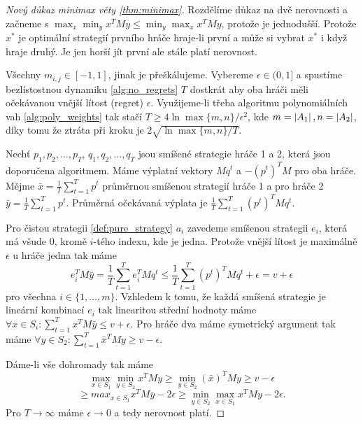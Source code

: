 \begin{proof}[Nový důkaz minimax věty \ref{thm:minimax}]
    Rozdělíme důkaz na dvě nerovnosti a začneme s $\max_x \min_y x^T My \leq \min_y \max_x x^T M y$, protože je jednodušší. 
    Protože $x^*$ je optimální strategií prvního hráče hraje-li první a může si vybrat $x^*$ i když hraje druhý. 
    Je jen horší jít první ale stále platí nerovnost. 

    Všechny $m_{i,j} \in [-1,1]$, jinak je přeškálujeme. 
    Vybereme $\epsilon \in (0,1]$ a spustíme bezlístostnou dynamiku \ref{alg:no_regrets} $T$ dostkrát aby oba hráči měli očekávanou vnější lítost (regret) $\epsilon$. 
    Využijeme-li třeba algoritmu polynomiálních vah \ref{alg:poly_weights} tak stačí $T \geq 4\ln \max\{m,n\}/\epsilon^2$, kde $m = \left|A_1\right|, n = \left|A_2\right|$, díky tomu že ztráta při kroku je $2\sqrt{\ln \max\{m,n\}/T}$. 
    
    Nechť $p_1,p_2,\dots,p_T$, $q_1,q_2,\dots,q_T$ jsou smíšené strategie hráče 1 a 2, která jsou doporučena algoritmem. 
    Máme výplatní vektory $Mq^t$ a $-(p^t)^T M$ pro oba hráče. 
    Mějme $\bar{x} = \frac{1}{T} \sum^T_{t=1} p^t$ průměrnou smíšenou strategií hráče 1 a pro hráče 2 $\bar{y} = \frac{1}{T} \sum_{t=1}^T p^t$. 
    Průměrná očekávaná výplata je $\frac{1}{T} \sum_{t=1}^T (p^t)^T M q^t$. 

    Pro čistou strategii \ref{def:pure_strategy} $a_i$ zavedeme smíšenou strategii $e_i$, která má všude $0$, kromě $i$-tého indexu, kde je jedna. 
    Protože vnější lítost je maximálně $\epsilon$ u hráče jedna tak máme 
    \[
        e_i^T M \bar{y} = \frac{1}{T} \sum^T_{t=1} e_i^T M q^t \leq \frac{1}{T} \sum_{t=1}^T (p^t)^T M q^t + \epsilon = v +\epsilon 
    \]
    pro všechna $i\in \{1,\dots,m\}$. 
    Vzhledem k tomu, že každá smíšená strategie je lineární kombinací $e_i$ tak linearitou střední hodnoty máme $\forall x \in S_i: \sum_{t=1}^T x^T M \bar{y} \leq v+\epsilon$. 
    Pro hráče dva máme symetrický argument tak máme $\forall y \in S_2: \sum_{t=1}^T \bar{x}^T M y \geq v-\epsilon$. 

    Dáme-li vše dohromady tak máme 
    \[
        \max_{x\in S_1} \min_{y\in S_2} x^T M y \geq \min_{y\in S_2} (\bar{x})^T M y \geq v-\epsilon 
    \]
    \[
        \geq max_{x\in S_1} x^T M \bar{y} -2\epsilon \geq  \min_{y\in S_2} \max_{x\in S_1} x^T M y -2\epsilon.
    \]
    Pro $T\rightarrow \infty$ máme $\epsilon \rightarrow 0$ a tedy nerovnost platí. 
\end{proof}

